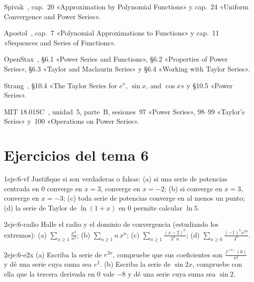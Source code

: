 \begin{lecturas}
\item Spivak~\cite{spivak}, cap.~20 «Approximation by Polynomial Functions» y cap.~24 «Uniform Convergence and Power Series».
\item Apostol~\cite{apostol}, cap.~7 «Polynomial Approximations to Functions» y cap.~11 «Sequences and Series of Functions».
\item OpenStax~\cite{openstax2}, §6.1 «Power Series and Functions», §6.2 «Properties of Power Series», §6.3 «Taylor and Maclaurin Series» y §6.4 «Working with Taylor Series».
\item Strang~\cite{strang}, §10.4 «The Taylor Series for $e^x$, $\sin x$, and $\cos x$» y §10.5 «Power Series».
\item MIT 18.01SC~\cite{mit1801}, unidad~5, parte~B, sesiones~97 «Power Series», 98--99 «Taylor's Series» y~100 «Operations on Power Series».
\end{lecturas}

\section*{Ejercicios del tema 6}

\begin{ejercicio}{1}{eje:6-vf}
Justifique si son verdaderas o falsas: (a) si una serie de potencias centrada en $0$ converge en $x=3$, converge en $x=-2$; (b) si converge en $x=3$, converge en $x=-3$; (c) toda serie de potencias converge en al menos un punto; (d) la serie de Taylor de $\ln(1+x)$ en $0$ permite calcular $\ln5$.
\end{ejercicio}

\begin{ejercicio}{2}{eje:6-radio}
Halle el radio y el dominio de convergencia (estudiando los extremos): (a) $\sum_{n\ge1}\frac{x^{n}}{n^{2}}$; (b) $\sum_{n\ge1}n\,x^{n}$; (c) $\sum_{n\ge1}\frac{(x-2)^{n}}{3^{n}\,n}$; (d) $\sum_{n\ge0}\frac{(-1)^{n}x^{2n}}{4^{n}}$.
\end{ejercicio}

\begin{ejercicio}{2}{eje:6-e2x}
(a) Escriba la serie de $e^{2x}$, compruebe que sus coeficientes son $\frac{f^{(n)}(0)}{n!}$ y dé una serie cuya suma sea $e^{2}$. (b) Escriba la serie de $\sin2x$, compruebe con ella que la tercera derivada en $0$ vale $-8$ y dé una serie cuya suma sea $\sin2$.
\end{ejercicio}

